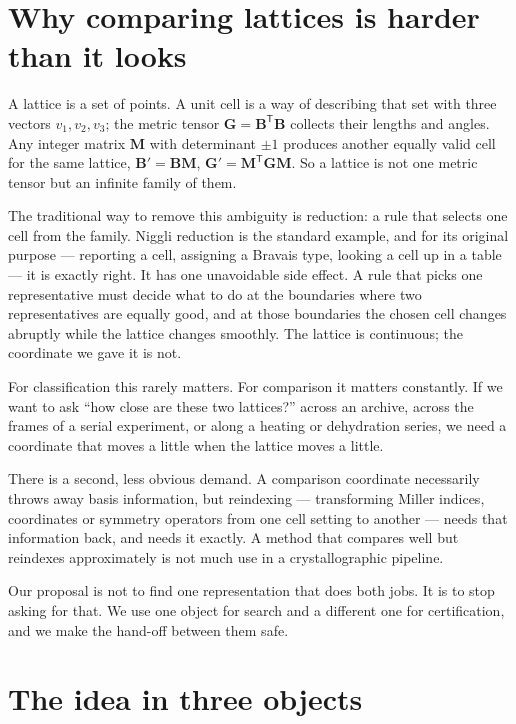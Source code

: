 \documentclass[11pt]{article}
\newcommand{\Gmet}{\mathbf{G}}
\newcommand{\Mop}{\mathbf{M}}
\newcommand{\Bbasis}{\mathbf{B}}
\begin{document}
\section{Why comparing lattices is harder than it looks}

A lattice is a set of points. A unit cell is a way of describing that set with three vectors $v_1,v_2,v_3$; the metric tensor $\Gmet=\Bbasis^{\mathsf T}\Bbasis$ collects their lengths and angles. Any integer matrix $\Mop$ with determinant $\pm1$ produces another equally valid cell for the same lattice, $\Bbasis'=\Bbasis\Mop$, $\Gmet'=\Mop^{\mathsf T}\Gmet\Mop$. So a lattice is not one metric tensor but an infinite family of them.

The traditional way to remove this ambiguity is reduction: a rule that selects one cell from the family. Niggli reduction is the standard example, and for its original purpose --- reporting a cell, assigning a Bravais type, looking a cell up in a table --- it is exactly right. It has one unavoidable side effect. A rule that picks one representative must decide what to do at the boundaries where two representatives are equally good, and at those boundaries the chosen cell changes abruptly while the lattice changes smoothly. The lattice is continuous; the coordinate we gave it is not.

For classification this rarely matters. For comparison it matters constantly. If we want to ask ``how close are these two lattices?'' across an archive, across the frames of a serial experiment, or along a heating or dehydration series, we need a coordinate that moves a little when the lattice moves a little.

There is a second, less obvious demand. A comparison coordinate necessarily throws away basis information, but reindexing --- transforming Miller indices, coordinates or symmetry operators from one cell setting to another --- needs that information back, and needs it exactly. A method that compares well but reindexes approximately is not much use in a crystallographic pipeline.

Our proposal is not to find one representation that does both jobs. It is to stop asking for that. We use one object for search and a different one for certification, and we make the hand-off between them safe.

\section{The idea in three objects}
\end{document}
